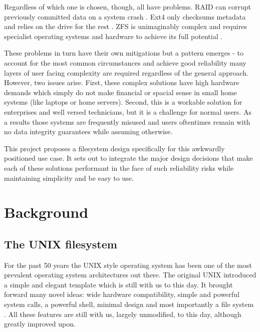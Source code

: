    Regardless of which one is chosen, though, all have problems. RAID can
    corrupt previously committed data on a system crash \cite{LWN_md_journal}.
    Ext4 only checksums metadata and relies on the drive for the rest
    \cite{ext4_docs}. ZFS is unimaginably complex \cite{ZFS_spec} and requires
    specialist operating systems and hardware to achieve its full potential
    \cite{TrueNAS_hardware_guide}.

    These problems in turn have their own mitigations but a pattern emerges -
    to account for the most common circumstances and achieve good reliability
    many layers of user facing complexity are required regardless of the
    general approach. However, two issues arise. First, these complex solutions
    have high hardware demands which simply do not make financial or spacial
    sense in small home systems (like laptops or home servers). Second, this is
    a workable solution for enterprises and well versed technicians, but it is
    a challenge for normal users. As a results those systems are frequently
    misused \cite{LTT_data_loss} and users oftentimes remain with no data
    integrity guarantees while assuming otherwise.

    This project proposes a filesystem design specifically for this awkwardly
    positioned use case. It sets out to integrate the major design decisions
    that make each of these solutions performant in the face of such reliability risks
    while maintaining simplicity and be easy to use.

\chapter{Background}
    \section{The UNIX filesystem}
        \label{sec:UFS}

        For the past 50 years the UNIX style operating system has been one of
        the most prevalent operating system architectures out there. The
        original UNIX introduced a simple and elegant template which is still
        with us to this day. It brought forward many novel ideas: wide hardware
        compatibility, simple and powerful system calls, a powerful shell,
        minimal design and most importantly a file system \cite{UFS}. All these
        features are still with us, largely unmodified, to this day, although
        greatly improved upon.

